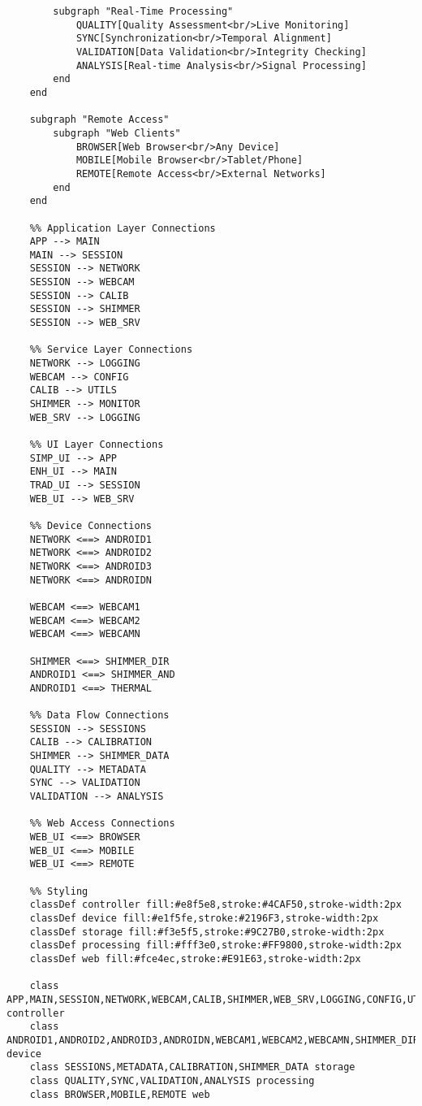 \documentclass[11pt,a4paper]{article}
\begin{document}
\begin{verbatim}
        subgraph "Real-Time Processing"
            QUALITY[Quality Assessment<br/>Live Monitoring]
            SYNC[Synchronization<br/>Temporal Alignment]
            VALIDATION[Data Validation<br/>Integrity Checking]
            ANALYSIS[Real-time Analysis<br/>Signal Processing]
        end
    end

    subgraph "Remote Access"
        subgraph "Web Clients"
            BROWSER[Web Browser<br/>Any Device]
            MOBILE[Mobile Browser<br/>Tablet/Phone]
            REMOTE[Remote Access<br/>External Networks]
        end
    end

    %% Application Layer Connections
    APP --> MAIN
    MAIN --> SESSION
    SESSION --> NETWORK
    SESSION --> WEBCAM
    SESSION --> CALIB
    SESSION --> SHIMMER
    SESSION --> WEB_SRV

    %% Service Layer Connections
    NETWORK --> LOGGING
    WEBCAM --> CONFIG
    CALIB --> UTILS
    SHIMMER --> MONITOR
    WEB_SRV --> LOGGING

    %% UI Layer Connections
    SIMP_UI --> APP
    ENH_UI --> MAIN
    TRAD_UI --> SESSION
    WEB_UI --> WEB_SRV

    %% Device Connections
    NETWORK <==> ANDROID1
    NETWORK <==> ANDROID2
    NETWORK <==> ANDROID3
    NETWORK <==> ANDROIDN

    WEBCAM <==> WEBCAM1
    WEBCAM <==> WEBCAM2
    WEBCAM <==> WEBCAMN

    SHIMMER <==> SHIMMER_DIR
    ANDROID1 <==> SHIMMER_AND
    ANDROID1 <==> THERMAL

    %% Data Flow Connections
    SESSION --> SESSIONS
    CALIB --> CALIBRATION
    SHIMMER --> SHIMMER_DATA
    QUALITY --> METADATA
    SYNC --> VALIDATION
    VALIDATION --> ANALYSIS

    %% Web Access Connections
    WEB_UI <==> BROWSER
    WEB_UI <==> MOBILE
    WEB_UI <==> REMOTE

    %% Styling
    classDef controller fill:#e8f5e8,stroke:#4CAF50,stroke-width:2px
    classDef device fill:#e1f5fe,stroke:#2196F3,stroke-width:2px
    classDef storage fill:#f3e5f5,stroke:#9C27B0,stroke-width:2px
    classDef processing fill:#fff3e0,stroke:#FF9800,stroke-width:2px
    classDef web fill:#fce4ec,stroke:#E91E63,stroke-width:2px

    class APP,MAIN,SESSION,NETWORK,WEBCAM,CALIB,SHIMMER,WEB_SRV,LOGGING,CONFIG,UTILS,MONITOR,SIMP_UI,ENH_UI,TRAD_UI,WEB_UI controller
    class ANDROID1,ANDROID2,ANDROID3,ANDROIDN,WEBCAM1,WEBCAM2,WEBCAMN,SHIMMER_DIR,SHIMMER_AND,THERMAL device
    class SESSIONS,METADATA,CALIBRATION,SHIMMER_DATA storage
    class QUALITY,SYNC,VALIDATION,ANALYSIS processing
    class BROWSER,MOBILE,REMOTE web
\end{verbatim}
\end{document}
